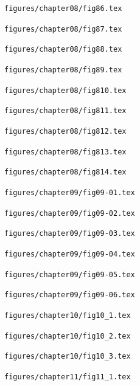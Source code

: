 \documentclass[11pt,a4paper]{article}
\begin{document}
\clearpage
\noindent\texttt{figures/chapter08/fig86.tex}


\clearpage
\noindent\texttt{figures/chapter08/fig87.tex}


\clearpage
\noindent\texttt{figures/chapter08/fig88.tex}


\clearpage
\noindent\texttt{figures/chapter08/fig89.tex}


\clearpage
\noindent\texttt{figures/chapter08/fig810.tex}


\clearpage
\noindent\texttt{figures/chapter08/fig811.tex}


\clearpage
\noindent\texttt{figures/chapter08/fig812.tex}


\clearpage
\noindent\texttt{figures/chapter08/fig813.tex}


\clearpage
\noindent\texttt{figures/chapter08/fig814.tex}


\clearpage
\noindent\texttt{figures/chapter09/fig09-01.tex}


\clearpage
\noindent\texttt{figures/chapter09/fig09-02.tex}


\clearpage
\noindent\texttt{figures/chapter09/fig09-03.tex}


\clearpage
\noindent\texttt{figures/chapter09/fig09-04.tex}


\clearpage
\noindent\texttt{figures/chapter09/fig09-05.tex}


\clearpage
\noindent\texttt{figures/chapter09/fig09-06.tex}


\clearpage
\noindent\texttt{figures/chapter10/fig10\_1.tex}


\clearpage
\noindent\texttt{figures/chapter10/fig10\_2.tex}


\clearpage
\noindent\texttt{figures/chapter10/fig10\_3.tex}


\clearpage
\noindent\texttt{figures/chapter11/fig11\_1.tex}

\end{document}
